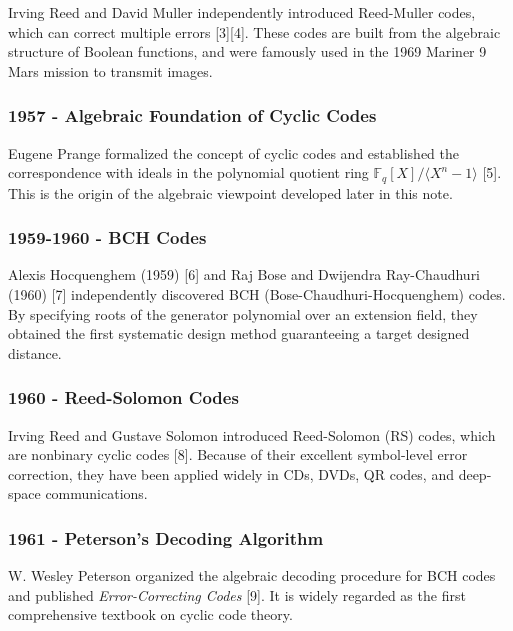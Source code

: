 \documentclass[
]{article}
\begin{document}
Irving Reed and David Muller independently introduced Reed-Muller codes,
which can correct multiple errors {[}3{]}{[}4{]}. These codes are built
from the algebraic structure of Boolean functions, and were famously
used in the 1969 Mariner 9 Mars mission to transmit images.

\subsubsection{1957 - Algebraic Foundation of Cyclic
Codes}\label{algebraic-foundation-of-cyclic-codes}

Eugene Prange formalized the concept of cyclic codes and established the
correspondence with ideals in the polynomial quotient ring
\(\mathbb{F}_q[X]/\langle X^n - 1 \rangle\) {[}5{]}. This is the origin
of the algebraic viewpoint developed later in this note.

\subsubsection{1959-1960 - BCH Codes}\label{bch-codes}

Alexis Hocquenghem (1959) {[}6{]} and Raj Bose and Dwijendra
Ray-Chaudhuri (1960) {[}7{]} independently discovered BCH
(Bose-Chaudhuri-Hocquenghem) codes. By specifying roots of the generator
polynomial over an extension field, they obtained the first systematic
design method guaranteeing a target designed distance.

\subsubsection{1960 - Reed-Solomon Codes}\label{reed-solomon-codes}

Irving Reed and Gustave Solomon introduced Reed-Solomon (RS) codes,
which are nonbinary cyclic codes {[}8{]}. Because of their excellent
symbol-level error correction, they have been applied widely in CDs,
DVDs, QR codes, and deep-space communications.

\subsubsection{1961 - Peterson's Decoding
Algorithm}\label{petersons-decoding-algorithm}

W. Wesley Peterson organized the algebraic decoding procedure for BCH
codes and published \emph{Error-Correcting Codes} {[}9{]}. It is widely
regarded as the first comprehensive textbook on cyclic code theory.
\end{document}
